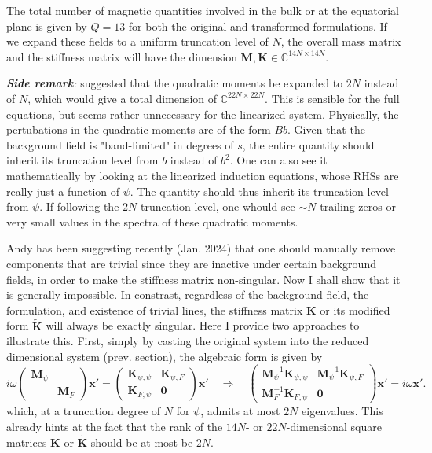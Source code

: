 The total number of magnetic quantities involved in the bulk or at the equatorial plane is given by $Q=13$ for both the original and transformed formulations. If we expand these fields to a uniform truncation level of $N$, the overall mass matrix and the stiffness matrix will have the dimension $\mathbf{M}, \mathbf{K} \in \mathbb{C}^{14N\times 14N}$. 
\medskip

\noindent \textit{\textbf{Side remark}:} \textcite{holdenried-chernoff_long_2021} suggested that the quadratic moments be expanded to $2N$ instead of $N$, which would give a total dimension of $\mathbb{C}^{22N\times 22N}$. This is sensible for the full equations, but seems rather unnecessary for the linearized system.
Physically, the pertubations in the quadratic moments are of the form $Bb$. Given that the background field is "band-limited" in degrees of $s$, the entire quantity should inherit its truncation level from $b$ instead of $b^2$.
One can also see it mathematically by looking at the linearized induction equations, whose RHSs are really just a function of $\psi$. The quantity should thus inherit its truncation level from $\psi$. If following the $2N$ truncation level, one whould see $\sim N$ trailing zeros or very small values in the spectra of these quadratic moments.
\medskip

Andy has been suggesting recently (Jan. 2024) that one should manually remove components that are trivial since they are inactive under certain background fields, in order to make the stiffness matrix non-singular.
Now I shall show that it is generally impossible.
In constrast, regardless of the background field, the formulation, and existence of trivial lines, the stiffness matrix $\mathbf{K}$ or its modified form $\widetilde{\mathbf{K}}$ will always be exactly singular.
Here I provide two approaches to illustrate this.
First, simply by casting the original system into the reduced dimensional system (prev. section), the algebraic form is given by
\[
    i\omega \begin{pmatrix}
        \mathbf{M}_\psi & \\
        & \mathbf{M}_F
    \end{pmatrix} \mathbf{x}' = 
    \begin{pmatrix}
        \mathbf{K}_{\psi,\psi} & \mathbf{K}_{\psi,F} \\ 
        \mathbf{K}_{F,\psi} & \mathbf{0} 
    \end{pmatrix} \mathbf{x}' \quad \Longrightarrow \quad 
    \begin{pmatrix}
        \mathbf{M}_\psi^{-1} \mathbf{K}_{\psi,\psi} & \mathbf{M}_\psi^{-1} \mathbf{K}_{\psi,F} \\ 
        \mathbf{M}_F^{-1} \mathbf{K}_{F,\psi} & \mathbf{0} 
    \end{pmatrix} \mathbf{x}' = i\omega \mathbf{x}'.
\]
which, at a truncation degree of $N$ for $\psi$, admits at most $2N$ eigenvalues. This already hints at the fact that the rank of the $14N$- or $22N$-dimensional square matrices $\mathbf{K}$ or $\widetilde{\mathbf{K}}$ should be at most be $2N$.


